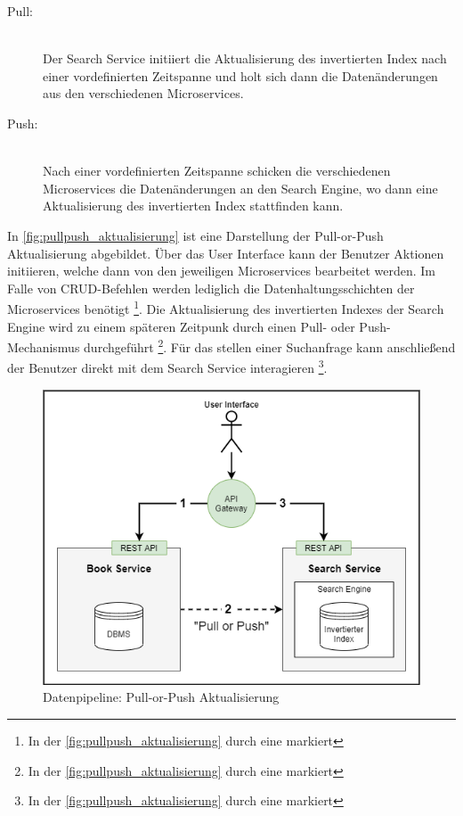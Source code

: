 \begin{description}
    \item[Pull:]\hfill \\
    Der Search Service initiiert die Aktualisierung des invertierten Index nach einer vordefinierten Zeitspanne und holt sich dann die Datenänderungen aus den verschiedenen Microservices.
    
    \item[Push:]\hfill \\
    Nach einer vordefinierten Zeitspanne schicken die verschiedenen Microservices die Datenänderungen an den Search Engine, wo dann eine Aktualisierung des invertierten Index stattfinden kann.

\end{description}

In \autoref{fig:pullpush_aktualisierung} ist eine Darstellung der Pull-or-Push Aktualisierung abgebildet. Über das User Interface kann der Benutzer Aktionen initiieren, welche dann von den jeweiligen Microservices bearbeitet werden. Im Falle von CRUD-Befehlen werden lediglich die Datenhaltungsschichten der Microservices benötigt \footnote{In der \autoref{fig:pullpush_aktualisierung} durch eine \grqq{} markiert}. Die Aktualisierung des invertierten Indexes der Search Engine wird zu einem späteren Zeitpunk durch einen Pull- oder Push-Mechanismus durchgeführt \footnote{In der \autoref{fig:pullpush_aktualisierung} durch eine \grqq{} markiert}. Für das stellen einer Suchanfrage kann anschließend der Benutzer direkt mit dem Search Service interagieren \footnote{In der \autoref{fig:pullpush_aktualisierung} durch eine \grqq{} markiert}.

\begin{figure}[H]
    \centering
    \includegraphics[width=0.6\linewidth]{images/pullpush_aktualisierung.png}
    \caption{Datenpipeline: Pull-or-Push Aktualisierung}
    \label{fig:pullpush_aktualisierung}
\end{figure}

